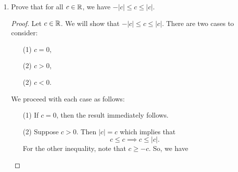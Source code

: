 \documentclass{article}
\begin{document}
\begin{enumerate}
\begin{proof}
        Now, we proceed with each case as follows:
        \begin{enumerate}
            \item[(1)] Suppose \( a = 0  \) and \( b = 0  \), then the result immediately follows.
            \item[(2)] Suppose \( a > 0  \) and \( b > 0  \). Then \( ab > 0  \) which implies that 
                \begin{align*}
                    | ab  | = a \cdot b = | a | \cdot | b |.
                \end{align*}
            \item[(3)] Suppose \( a < 0  \) and \( b > 0  \), then we have \( ab < 0  \). Thus,  
                \[  | ab | = -ab = (-a)(b) = | a | | b |.   \]
            \item[(4)] Suppose \( a> 0  \) and \( b < 0  \). Then we have \( a b < 0  \) which tells us that 
                \[  | ab  |  = -ab = (a)(-b) = | a |  | b |.  \]
            \item[(5)] Suppose \( a < 0  \) and \( b < 0  \). Then we have \( ab > 0  \) which tells us that 
                \[  | ab | = ab = (-a)(-b) = | a |  | b |. \]
        \end{enumerate}
        Thus, we conclude that for all \( a,b \in \R  \), we have \( | ab | = | a |  | b |  \).
        \end{proof}
    \item Prove that for all \( c \in \mathbb{R}  \), we have \( - | c  |  \leq c \leq | c  |  \).  
        \begin{proof}
        Let \( c \in \mathbb{R}  \). We will show that \( - | c  |  \leq c \leq | c  |  \). There are two cases to consider: 
        \begin{enumerate}
            \item[(1)] \( c = 0 \),
            \item[(2)] \( c > 0  \), 
            \item[(2)] \( c < 0  \).
        \end{enumerate}
        We proceed with each case as follows:
        \begin{enumerate}
            \item[(1)] If \( c = 0  \), then the result immediately follows.
            \item[(2)] Suppose \( c > 0  \). Then \( | c  |  = c  \) which implies that 
        \[  c \leq c \implies c \leq | c  |. \]
        For the other inequality, note that \( c \geq -c  \). So, we have

\end{enumerate}
\end{proof}
\end{enumerate}
\end{document}
